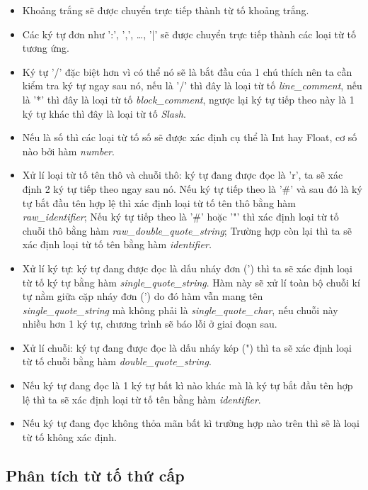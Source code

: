 \begin{itemize}
  \item Khoảng trắng sẽ được chuyển trực tiếp thành từ tố khoảng trắng.
  \item Các ký tự đơn như ':', ',', \dots , '|' sẽ được chuyển trực tiếp thành các loại từ tố tương ứng.
  \item Ký tự '/' đặc biệt hơn vì có thể nó sẽ là bắt đầu của 1 chú thích nên ta cần kiểm tra ký tự ngay sau nó, nếu là '/' thì đây là loại từ tố \textit{line\_comment}, nếu là '*' thì đây là loại từ tố \textit{block\_comment}, ngược lại ký tự tiếp theo này là 1 ký tự khác thì đây là loại từ tố \textit{Slash}.
  \item Nếu là số thì các loại từ tố số sẽ được xác định cụ thể là Int hay Float, cơ số nào bởi hàm \textit{number}.
  \item Xử lí loại từ tố tên thô và chuỗi thô: ký tự đang được đọc là 'r', ta sẽ xác định 2 ký tự tiếp theo ngay sau nó. Nếu ký tự tiếp theo là '\#' và sau đó là ký tự bắt đầu tên hợp lệ thì xác định loại từ tố tên thô bằng hàm \textit{raw\_identifier}; Nếu ký tự tiếp theo là '\#' hoặc '"' thì xác định loại từ tố chuỗi thô bằng hàm \textit{raw\_double\_quote\_string}; Trường hợp còn lại thì ta sẽ xác định loại từ tố tên bằng hàm \textit{identifier.}
  \item Xử lí ký tự: ký tự đang được đọc là dấu nháy đơn (') thì ta sẽ xác định loại từ tố ký tự bằng hàm \textit{single\_quote\_string}. Hàm này sẽ xử lí toàn bộ chuỗi kí tự nằm giữa cặp nháy đơn (') do đó hàm vẫn mang tên \\\textit{single\_quote\_string} mà không phải là \textit{single\_quote\_char}, nếu chuỗi này nhiều hơn 1 ký tự, chương trình sẽ báo lỗi ở giai đoạn sau.
  \item Xử lí chuỗi: ký tự đang được đọc là dấu nháy kép (") thì ta sẽ xác định loại từ tố chuỗi bằng hàm \textit{double\_quote\_string}. 
  \item Nếu ký tự đang đọc là 1 ký tự bất kì nào khác mà là ký tự bắt đầu tên hợp lệ thì ta sẽ xác định loại từ tố tên bằng hàm \textit{identifier}. 
  \item Nếu ký tự đang đọc không thỏa mãn bất kì trường hợp nào trên thì sẽ là loại từ tố không xác định.
\end{itemize}

\subsection{Phân tích từ tố thứ cấp}

